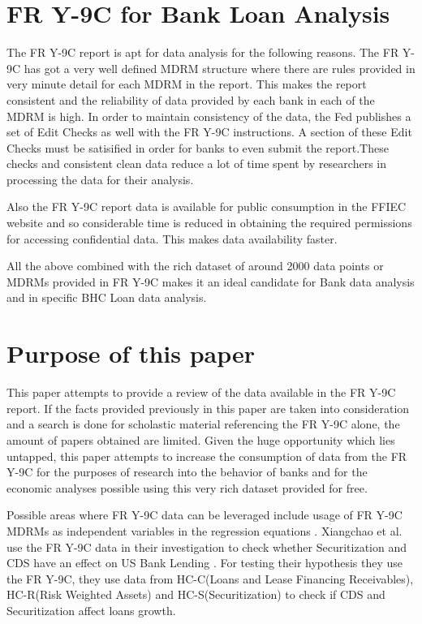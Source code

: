 \documentclass[conference]{IEEEtran}
\begin{document}
\section{FR Y-9C for Bank Loan Analysis}
      The FR Y-9C report is apt for data analysis for the following reasons. The FR Y-9C has got a very well defined MDRM structure where there are rules provided in very minute detail for each MDRM in the report. This makes the report consistent and the reliability of data provided by each bank in each of the MDRM is high. In order to maintain consistency of the data, the Fed publishes a set of Edit Checks as well with the FR Y-9C instructions. A section of these Edit Checks must be satisified in order for banks to even submit the report.These checks and consistent clean data reduce a lot of time spent by researchers in processing the data for their analysis. 
      
      Also the FR Y-9C report data is available for public consumption in the FFIEC website and so considerable time is reduced in obtaining the required permissions for accessing confidential data. This makes data availability faster.
      
      All the above combined with the rich dataset of around 2000 data points or MDRMs provided in FR Y-9C makes it an ideal candidate for Bank data analysis and in specific BHC Loan data analysis.
\section{Purpose of this paper}
This paper attempts to provide a review of the data available in the FR Y-9C report. If the facts provided previously in this paper are taken into consideration and a search is done for scholastic material referencing the FR Y-9C alone, the amount of papers obtained are limited. Given the huge opportunity which lies untapped, this paper attempts to increase the consumption of data from the FR Y-9C for the purposes of research into the behavior of banks and for the economic analyses possible using this very rich dataset provided for free.

Possible areas where FR Y-9C data can be leveraged include usage of FR Y-9C MDRMs as independent variables in the regression equations . Xiangchao et al. \cite{SecRef} use the FR Y-9C data in their investigation to check whether Securitization and CDS have an effect on US Bank Lending . For testing their hypothesis they use the FR Y-9C, they use data from HC-C(Loans and Lease Financing Receivables), HC-R(Risk Weighted Assets) and HC-S(Securitization) to check if CDS and Securitization affect loans growth.
\end{document}
